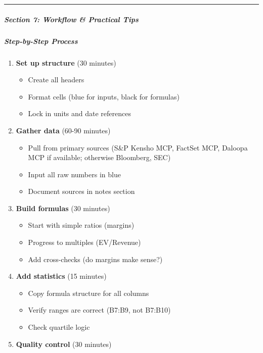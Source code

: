 \documentclass[11pt]{article}
\begin{document}
\vspace{0.5em}\hrule\vspace{0.5em}

\subparagraph{Section 7: Workflow \& Practical Tips}\mbox{}\par

\subparagraph{Step-by-Step Process}\mbox{}\par
\begin{enumerate}[leftmargin=*,itemsep=2pt,topsep=2pt]
\item {} \textbf{Set up structure} (30 minutes)
\begin{itemize}[leftmargin=*,itemsep=2pt,topsep=2pt]
\item {} Create all headers
\item {} Format cells (blue for inputs, black for formulas)
\item {} Lock in units and date references
\end{itemize}
\item {} \textbf{Gather data} (60-90 minutes)
\begin{itemize}[leftmargin=*,itemsep=2pt,topsep=2pt]
\item {} Pull from primary sources (S\&P Kensho MCP, FactSet MCP, Daloopa MCP if available; otherwise Bloomberg, SEC)
\item {} Input all raw numbers in blue
\item {} Document sources in notes section
\end{itemize}
\item {} \textbf{Build formulas} (30 minutes)
\begin{itemize}[leftmargin=*,itemsep=2pt,topsep=2pt]
\item {} Start with simple ratios (margins)
\item {} Progress to multiples (EV/Revenue)
\item {} Add cross-checks (do margins make sense?)
\end{itemize}
\item {} \textbf{Add statistics} (15 minutes)
\begin{itemize}[leftmargin=*,itemsep=2pt,topsep=2pt]
\item {} Copy formula structure for all columns
\item {} Verify ranges are correct (B7:B9, not B7:B10)
\item {} Check quartile logic
\end{itemize}
\item {} \textbf{Quality control} (30 minutes)
\begin{itemize}[leftmargin=*,itemsep=2pt,topsep=2pt]

\end{itemize}
\end{enumerate}
\end{document}
